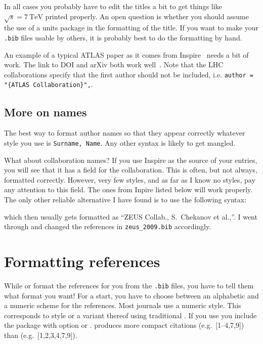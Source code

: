 In all cases you probably have to edit the titles a bit to get
things like \(\sqrt{s} = \SI{7}{\TeV}\) printed properly. An open
question is whether you should assume the use of a units package in
the formatting of the title. If you want to make your \texttt{.bib}
files usable by others, it is probably best to do the formatting by
hand.

An example of a typical ATLAS paper as it comes from
Inspire~\cite{Aad:2010ey-inspire} needs a bit of work.
The link to DOI and arXiv both work well~\cite{Aad:2010ey-final}.
Note that the LHC collaborations specify that the first author should not
be included, i.e. \verb|author = "{ATLAS Collaboration}",|.


\subsection{More on names}%
\label{sec:ref:names}

The best way to format author names so that they appear correctly
whatever \BibTeX{} style you use is \texttt{Surname, Name}. Any other
syntax is likely to get mangled.

What about collaboration names? If you use Inspire as the source of
your \BibTeX{} entries, you will see that it has a field for the
collaboration. This is often, but not always, formatted
correctly. 
However, very few \BibTeX{} styles, and as far as I know no  styles, 
pay any attention to this field.
The ones from Inpire listed below will work properly. The
only other reliable alternative I have found is to use the following
syntax:
\begin{tcblisting}{listing only}
@Article{Chekanov:2009qja,
     author    = "{ZEUS Collab.} and Chekanov, S. and others",
\end{tcblisting}
which then usually gets formatted as \enquote{ZEUS Collab., S.\ Chekanov et
al.,}.
I went through and changed the references in \texttt{zeus\_2009.bib}
accordingly.


\section{Formatting references}%
\label{sec:ref:format}

While \BibTeX{} or  format the references for you
from the \texttt{.bib} files, you have to tell them what format you
want!  For a start, you have to choose between an alphabetic and a
numeric scheme for the references. Most journals use a numeric
style. This corresponds to style  or a variant thereof
using traditional \BibTeX.  If you use  you include the
package with option  or
.  produces more compact
citations (e.g.\ [1--4,7,9]) than  (e.g.\ [1,2,3,4,7,9]).

